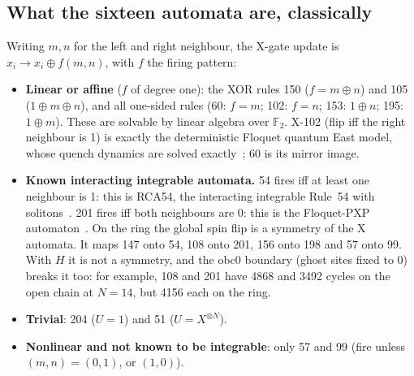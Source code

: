 \subsection{What the sixteen automata are, classically}
Writing $m,n$ for the left and right neighbour, the X-gate update is $x_i\to x_i\oplus f(m,n)$, with $f$ the firing
pattern:
\begin{itemize}
\item \textbf{Linear or affine} ($f$ of degree one): the XOR rules 150 ($f=m\oplus n$) and 105 ($1\oplus m\oplus n$),
  and all one-sided rules (60: $f=m$; 102: $f=n$; 153: $1\oplus n$; 195: $1\oplus m$). These are solvable by linear
  algebra over $\mathbb F_2$. X-102 (flip iff the right neighbour is 1) is exactly the deterministic Floquet quantum East
  model, whose quench dynamics are solved exactly~\cite{bertini2024det}; 60 is its mirror image.
\item \textbf{Known interacting integrable automata.} 54 fires iff at least one neighbour is 1: this is RCA54, the
  interacting integrable Rule~54 with solitons~\cite{buca2021}. 201 fires iff both neighbours are 0: this is the
  Floquet-PXP automaton~\cite{wilkinson2020}. On the ring the global spin flip is a symmetry of the X automata. It maps
  147 onto 54, 108 onto 201, 156 onto 198 and 57 onto 99. With $H$ it is not a symmetry, and the obc0 boundary (ghost sites
  fixed to 0) breaks it too: for example, 108 and 201 have 4868 and 3492 cycles on the open chain at $N=14$, but 4156
  each on the ring.
\item \textbf{Trivial}: 204 ($U=1$) and 51 ($U=X^{\otimes N}$).
\item \textbf{Nonlinear and not known to be integrable}: only 57 and 99 (fire unless $(m,n)=(0,1)$, or $(1,0)$).
\end{itemize}


